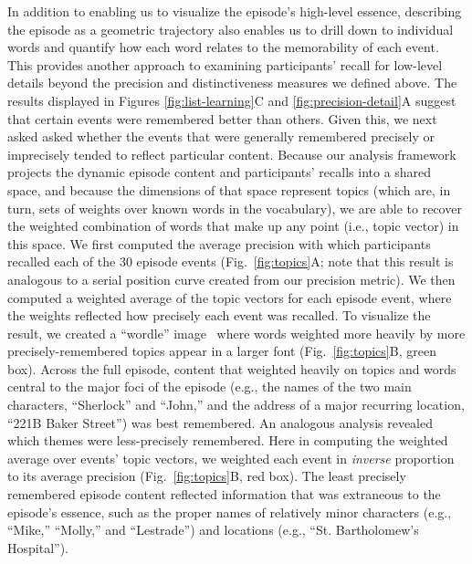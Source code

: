 \documentclass[10pt]{article}
\begin{document}
In addition to enabling us to visualize the episode's high-level essence, describing the episode as a geometric trajectory also enables us to drill down to individual words and quantify how each word relates to the memorability of each event.  This provides another approach to examining participants' recall for low-level details beyond the precision and distinctiveness measures we defined above.  The results displayed in Figures \ref{fig:list-learning}C and \ref{fig:precision-detail}A suggest that certain events were remembered better than others.  Given this, we next asked asked whether the events that were generally remembered precisely or imprecisely tended to reflect particular content.  Because our analysis framework projects the dynamic episode content and participants' recalls into a shared space, and because the dimensions of that space represent topics (which are, in turn, sets of weights over known words in the vocabulary), we are able to recover the weighted combination of words that make up any point (i.e., topic vector) in this space.  We first computed the average precision with which participants recalled each of the 30 episode events (Fig.~\ref{fig:topics}A; note that this result is analogous to a serial position curve created from our precision metric).  We then computed a weighted average of the topic vectors for each episode event, where the weights reflected how precisely each event was recalled.  To visualize the result, we created a ``wordle'' image~\citep{MuelEtal18} where words weighted more heavily by more precisely-remembered topics appear in a larger font (Fig.~\ref{fig:topics}B, green box).  Across the full episode, content that weighted heavily on topics and words central to the major foci of the episode (e.g., the names of the two main characters, ``Sherlock'' and ``John,'' and the address of a major recurring location, ``221B Baker Street'') was best remembered.  An analogous analysis revealed which themes were less-precisely remembered.  Here in computing the weighted average over events' topic vectors, we weighted each event in \textit{inverse} proportion to its average precision (Fig.~\ref{fig:topics}B, red box).  The least precisely remembered episode content reflected information that was extraneous to the episode's essence, such as the proper names of relatively minor characters (e.g., ``Mike,'' ``Molly,'' and ``Lestrade'') and locations (e.g., ``St. Bartholomew's Hospital'').
\end{document}
